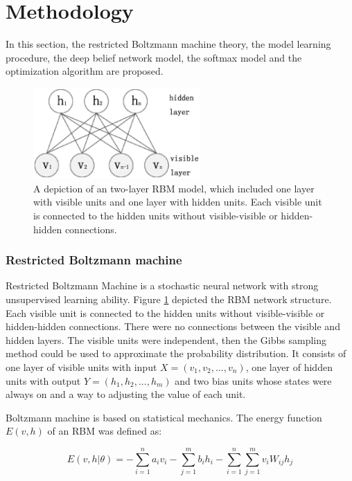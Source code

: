 \documentclass[conference]{IEEEtran}
\begin{document}
\section{Methodology}

In this section,  the restricted Boltzmann machine theory, the model learning procedure, the deep belief network model, the softmax model and the optimization algorithm are proposed.

\begin{figure}[]
\centering
\includegraphics[width=2.5in]{rbm.eps}
\caption{A depiction of an two-layer RBM model, which included one layer with visible units and one layer with hidden units. Each visible unit is connected to the hidden units without visible-visible or hidden-hidden connections.}
\label{figure1}
\end{figure}

\subsubsection{Restricted Boltzmann machine}

Restricted Boltzmann Machine \cite{Ruslan} is a stochastic neural network with strong unsupervised learning ability. 
Figure \ref{figure1} depicted the RBM network structure.  
Each visible unit is connected to the hidden units without visible-visible or hidden-hidden connections. 
There were no connections between the visible and hidden layers.
The visible units were independent, then the Gibbs sampling method could be used to approximate the probability distribution. 
It consists of one layer of visible units with input $X = (v_1,v_2,...,v_n)$, one layer of hidden units with output $Y = (h_1,h_2,...,h_m)$ and two bias units whose states were always on and a way to adjusting the value of each unit. 

Boltzmann machine is based on statistical mechanics. The energy function $E(v,h)$ of an RBM was defined as:

\begin{equation}
E(v,h|\theta) = -\sum_{i=1}^n{a_iv_i}-\sum_{j=1}^m{b_ih_i}-\sum_{i=1}^n\sum_{j=1}^m{v_iW_{ij}h_j}
\end{equation}
\end{document}
